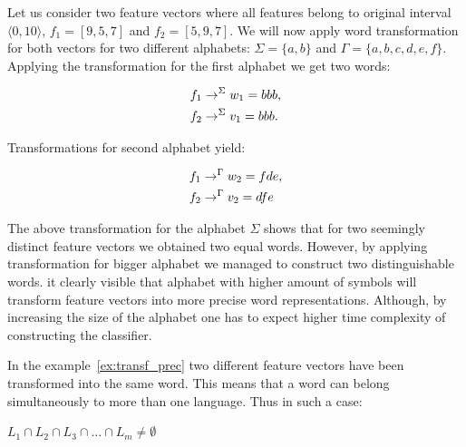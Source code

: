 \documentclass{mini}
\begin{document}
\begin{example} \label{ex:transf_prec}
    Let us consider two feature vectors where all features belong to original interval $\langle 0, 10 \rangle$, $f_1=[9, 5, 7]$ and $f_2=[5,9,7]$. We will now apply word transformation for both vectors for two different alphabets: $\Sigma=\{a,b\}$ and $\Gamma=\{a,b,c,d,e,f\}$. Applying the transformation for the first alphabet we get two words: 
    
    \begin{center}
        \begin{align*}
        &f_1 \rightarrow^{\Sigma} w_1 = bbb, \\ &f_2 \rightarrow^{\Sigma} v_1 = bbb.
        \end{align*}
    \end{center}
    
    Transformations for second alphabet yield: 
    
    \begin{center}
        \begin{align*}
        &f_1 \rightarrow^{\Gamma} w_2 = fde, \\ &f_2 \rightarrow^{\Gamma} v_2 = dfe
        \end{align*}
    \end{center}
\end{example}

The above transformation for the alphabet $\Sigma$ shows that for two seemingly distinct feature vectors we obtained two equal words. However, by applying transformation for bigger alphabet we managed to construct two distinguishable words.
it clearly visible that alphabet with higher amount of symbols will transform feature vectors into more precise word representations. Although, by increasing the size of the alphabet one has to expect higher time complexity of constructing the classifier.

In the example~\ref{ex:transf_prec} two different feature vectors have been transformed into the same word. This means that a word can belong simultaneously to more than one language. Thus in such a case:
\begin{center}
    $L_{1} \cap L_{2} \cap L_{3} \cap \ldots \cap L_{m} \neq \emptyset$
\end{center}

\end{document}
